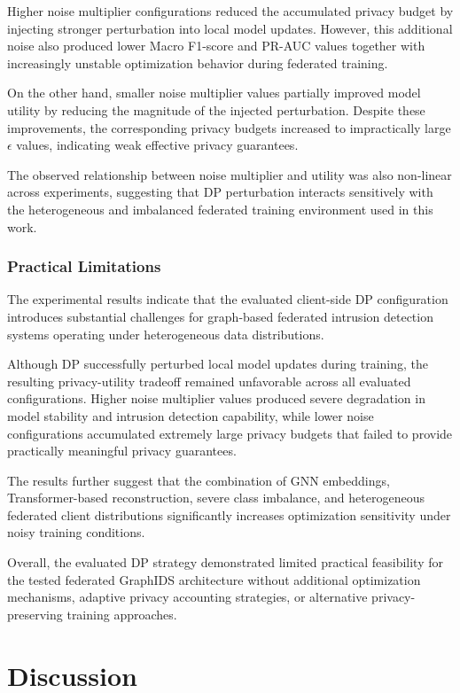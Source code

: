 \documentclass[conference]{IEEEtran}
\begin{document}
Higher noise multiplier configurations reduced the accumulated privacy budget by injecting stronger perturbation into local model updates. However, this additional noise also produced lower Macro F1-score and PR-AUC values together with increasingly unstable optimization behavior during federated training.

On the other hand, smaller noise multiplier values partially improved model utility by reducing the magnitude of the injected perturbation. Despite these improvements, the corresponding privacy budgets increased to impractically large $\epsilon$ values, indicating weak effective privacy guarantees.

The observed relationship between noise multiplier and utility was also non-linear across experiments, suggesting that DP perturbation interacts sensitively with the heterogeneous and imbalanced federated training environment used in this work.

\subsubsection{Practical Limitations}

The experimental results indicate that the evaluated client-side DP configuration introduces substantial challenges for graph-based federated intrusion detection systems operating under heterogeneous data distributions.

Although DP successfully perturbed local model updates during training, the resulting privacy-utility tradeoff remained unfavorable across all evaluated configurations. Higher noise multiplier values produced severe degradation in model stability and intrusion detection capability, while lower noise configurations accumulated extremely large privacy budgets that failed to provide practically meaningful privacy guarantees.

The results further suggest that the combination of GNN embeddings, Transformer-based reconstruction, severe class imbalance, and heterogeneous federated client distributions significantly increases optimization sensitivity under noisy training conditions.

Overall, the evaluated DP strategy demonstrated limited practical feasibility for the tested federated GraphIDS architecture without additional optimization mechanisms, adaptive privacy accounting strategies, or alternative privacy-preserving training approaches.

\section{Discussion}
\end{document}
